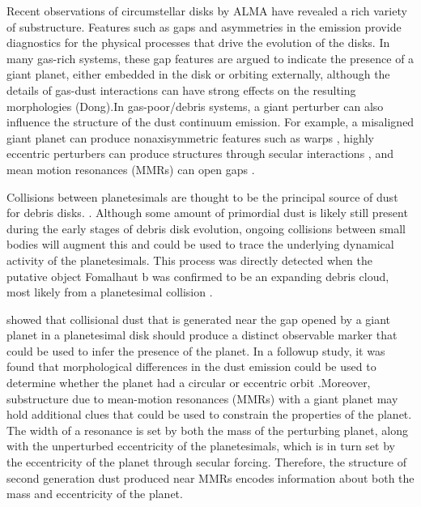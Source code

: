 \documentclass[twocolumn]{aastex63}
\begin{document}
Recent observations of circumstellar disks by ALMA have revealed a rich variety of substructure. Features such as gaps and asymmetries 
\citep{2015ApJ...808L...3A, 2016Sci...353.1519P, PhysRevLett.117.251101, 2016ApJ...820L..40A, 2016Natur.535..258C} in the emission provide 
diagnostics for the physical processes that drive the evolution of the disks. In many gas-rich systems, these gap features are argued to indicate the 
presence of a giant planet, either embedded in the disk \citep{2015MNRAS.453L..73D} or orbiting externally, although the details of gas-dust 
interactions can have strong effects on the resulting morphologies (Dong).In gas-poor/debris systems, a giant perturber can also influence the 
structure of the dust continuum emission. For example, a misaligned giant planet can produce nonaxisymmetric features such as warps \citep{2001A&A...370..447A}, highly eccentric perturbers can produce structures through secular interactions 
\citep{2014MNRAS.443.2541P, 2015MNRAS.448.3679P}, and mean motion resonances (MMRs) can open gaps
\citep{2015ApJ...798...83N, 2016ApJ...818..159T, 2018ApJ...857....3T}.

Collisions between planetesimals are thought to be the principal source of dust for debris disks. \citep[see][]{2008ARA&A..46..339W}.  Although some 
amount of primordial dust is likely still present during the early stages of debris disk evolution, ongoing collisions between small bodies will augment 
this and could be used to trace the underlying dynamical activity of the planetesimals. This process was directly detected when the putative object 
Fomalhaut b was confirmed to be an expanding debris cloud, most likely from a planetesimal collision \citep{2020PNAS..117.9712G}. 

\citet{2013ApJ...777L..31D} showed that collisional dust that is generated near the gap opened by a giant planet in a planetesimal disk should 
produce a distinct observable marker that could be used to infer the presence of the planet. In a followup study, it was found that morphological 
differences in the dust emission could be used to determine whether the planet had a circular or eccentric orbit \citep{2016ApJ...820...29D}.Moreover, 
substructure due to mean-motion resonances (MMRs) with a giant planet may hold additional clues that could be used to constrain the properties of 
the planet.  The width of a resonance is set by both the mass of the perturbing planet, along with the unperturbed eccentricity of the planetesimals, 
which is in turn set by the eccentricity of the planet through secular forcing. Therefore, the structure of second generation dust produced near MMRs 
encodes information about both the mass and eccentricity of the planet.
\end{document}

